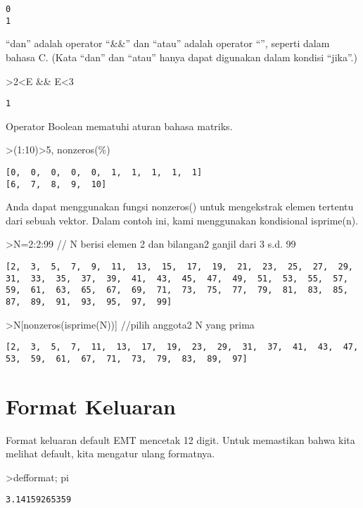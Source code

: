 \documentclass[
]{book}
\begin{document}
\begin{verbatim}
0
1
\end{verbatim}

``dan'' adalah operator ``\&\&'' dan ``atau'' adalah operator ``\textbar\textbar{}'', seperti dalam bahasa C. (Kata ``dan'' dan ``atau'' hanya dapat digunakan dalam kondisi ``jika''.)

\textgreater2\textless E \&\& E\textless3

\begin{verbatim}
1
\end{verbatim}

Operator Boolean mematuhi aturan bahasa matriks.

\textgreater(1:10)\textgreater5, nonzeros(\%)

\begin{verbatim}
[0,  0,  0,  0,  0,  1,  1,  1,  1,  1]
[6,  7,  8,  9,  10]
\end{verbatim}

Anda dapat menggunakan fungsi nonzeros() untuk mengekstrak elemen tertentu dari sebuah vektor. Dalam contoh ini, kami menggunakan kondisional isprime(n).

\textgreater N=2:2:99 // N berisi elemen 2 dan bilangan2 ganjil dari 3 s.d. 99

\begin{verbatim}
[2,  3,  5,  7,  9,  11,  13,  15,  17,  19,  21,  23,  25,  27,  29,
31,  33,  35,  37,  39,  41,  43,  45,  47,  49,  51,  53,  55,  57,
59,  61,  63,  65,  67,  69,  71,  73,  75,  77,  79,  81,  83,  85,
87,  89,  91,  93,  95,  97,  99]
\end{verbatim}

\textgreater N{[}nonzeros(isprime(N)){]} //pilih anggota2 N yang prima

\begin{verbatim}
[2,  3,  5,  7,  11,  13,  17,  19,  23,  29,  31,  37,  41,  43,  47,
53,  59,  61,  67,  71,  73,  79,  83,  89,  97]
\end{verbatim}

\section{Format Keluaran}\label{format-keluaran}

Format keluaran default EMT mencetak 12 digit. Untuk memastikan bahwa kita melihat default, kita mengatur ulang formatnya.

\textgreater defformat; pi

\begin{verbatim}
3.14159265359
\end{verbatim}
\end{document}
